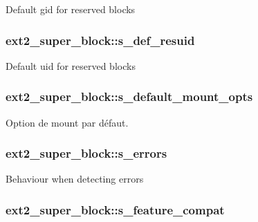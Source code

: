 Default gid for reserved blocks \hypertarget{structext2__super__block_a83da108c4a1f27a275f54970fb8edf07}{
\subsubsection[{s\+\_\+def\+\_\+resuid}]{ ext2\+\_\+super\+\_\+block\+::s\+\_\+def\+\_\+resuid}}\label{structext2__super__block_a83da108c4a1f27a275f54970fb8edf07}
Default uid for reserved blocks \hypertarget{structext2__super__block_a8f4946dffa8c6a9027ee9329fd3f94c9}{
\subsubsection[{s\+\_\+default\+\_\+mount\+\_\+opts}]{ ext2\+\_\+super\+\_\+block\+::s\+\_\+default\+\_\+mount\+\_\+opts}}\label{structext2__super__block_a8f4946dffa8c6a9027ee9329fd3f94c9}
Option de mount par défaut. \hypertarget{structext2__super__block_a06e31d621f6250d56d1af5c342220a08}{
\subsubsection[{s\+\_\+errors}]{ ext2\+\_\+super\+\_\+block\+::s\+\_\+errors}}\label{structext2__super__block_a06e31d621f6250d56d1af5c342220a08}
Behaviour when detecting errors \hypertarget{structext2__super__block_a1cf404a1bcfb748e924c62032cd723a5}{
\subsubsection[{s\+\_\+feature\+\_\+compat}]{ ext2\+\_\+super\+\_\+block\+::s\+\_\+feature\+\_\+compat}}\label{structext2__super__block_a1cf404a1bcfb748e924c62032cd723a5}
